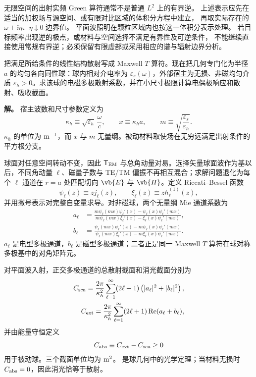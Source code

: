 无限空间的出射实频 Green 算符通常不是普通 $L^2$ 上的有界逆。
上述表示应先在适当的加权场与源空间、或有限对比区域的体积分方程中建立，
再取实际存在的 $\omega+\ii\eta$、$\eta\downarrow0$ 边界值。
平面波照明在颗粒区域内也按这一体积分表示处理。
若目标频率出现逆的极点，或材料与空间选择不满足有界性及可逆条件，
不能继续直接使用常规有界逆；必须保留有限虚部或采用相应的谱与辐射边界分析。

\begin{exbox}
 把满足所给条件的线性结构散射写成 Maxwell $T$ 算符。现在把几何专门化为半径 $a$ 的均匀各向同性球：球内相对介电率为 $\varepsilon_s(\omega)$，外部宿主为无损、非磁均匀介质 $\varepsilon_h>0$。求该球的电磁多极散射系数，并在小尺寸极限计算电偶极响应和散射、吸收截面。

\textbf{解。} 宿主波数和尺寸参数定义为
\begin{equation*}
\kappa_h\equiv \sqrt{\varepsilon_h}\,\frac{\omega}{c},
\qquad
x\equiv \kappa_h a,
\qquad
m\equiv\sqrt{\frac{\varepsilon_s}{\varepsilon_h}}.
\end{equation*}
$\kappa_h$ 的单位为 ${\rm m^{-1}}$，而 $x$ 与 $m$ 无量纲。被动材料取使场在无穷远满足出射条件的平方根分支。

球面对任意空间转动不变，因此 $\mathsf T_{\rm EM}$ 与总角动量对易。选择矢量球面波作为基以后，不同角动量 $\ell$、磁量子数与 TE/TM 偏振不再相互混合；求解问题退化为每个 $\ell$ 通道在 $r=a$ 处匹配切向 $\vb{E}$ 与 $\vb{H}$。定义 Riccati--Bessel 函数
\begin{equation*}
\psi_\ell(z)\equiv z j_\ell(z),
\qquad
\xi_\ell(z)\equiv z h_\ell^{(1)}(z),
\end{equation*}
并用撇号表示对完整自变量求导。对非磁球，两个无量纲 Mie 通道系数为
\begin{align}
 a_\ell
 &=
 \frac{m\psi_\ell(mx)\psi_\ell'(x)
 -\psi_\ell(x)\psi_\ell'(mx)}
 {m\psi_\ell(mx)\xi_\ell'(x)
 -\xi_\ell(x)\psi_\ell'(mx)},
 \label{eq:mie-electric-coefficient-dp75}\\
 b_\ell
 &=
 \frac{\psi_\ell(mx)\psi_\ell'(x)
 -m\psi_\ell(x)\psi_\ell'(mx)}
 {\psi_\ell(mx)\xi_\ell'(x)
 -m\xi_\ell(x)\psi_\ell'(mx)}.
 \label{eq:mie-magnetic-coefficient-dp75}
\end{align}
$a_\ell$ 是电型多极通道，$b_\ell$ 是磁型多极通道；二者正是同一 Maxwell $T$ 算符在球对称多极基中的对角矩阵元。

对平面波入射，正交多极通道的总散射截面和消光截面分别为
\begin{align}
 {
 C_{\rm sca}
 =\frac{2\pi}{\kappa_h^2}
 \sum_{\ell=1}^{\infty}(2\ell+1)
 \left(|a_\ell|^2+|b_\ell|^2\right),}
 \label{eq:mie-scattering-cross-section-dp75}\\
 {
 C_{\rm ext}
 =\frac{2\pi}{\kappa_h^2}
 \sum_{\ell=1}^{\infty}(2\ell+1)
 \operatorname{Re}(a_\ell+b_\ell),}
 \label{eq:mie-extinction-cross-section-dp75}
\end{align}
并由能量守恒定义
\begin{equation*}
C_{\rm abs}\equiv C_{\rm ext}-C_{\rm sca}\ge0
\end{equation*}
用于被动球。三个截面单位均为 ${\rm m^2}$。 是球几何中的光学定理；当材料无损时 $C_{\rm abs}=0$，因此消光恰等于散射。


\end{exbox}
